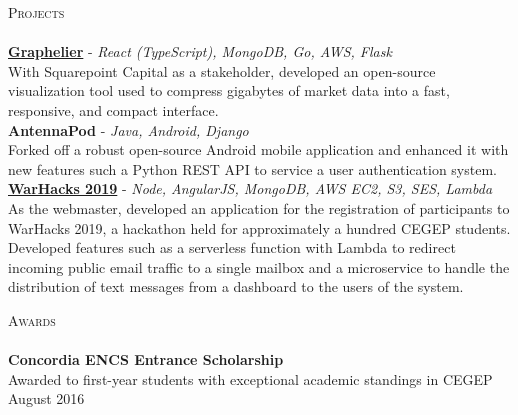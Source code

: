 \documentclass[a4paper]{article}
\newcommand{\lineunder} {
    \vspace*{-8pt} \\
    \hspace*{-18pt} \hrulefill \\
}
\newcommand{\header} [1] {
    {\hspace*{-18pt}\vspace*{6pt} \textsc{#1}}
    \vspace*{-6pt} \lineunder
}
\begin{document}
\header{Projects}
\vspace*{2mm}
{\href{https://github.com/Lercerss/graphelier}{\textbf{Graphelier}}} - {\sl React (TypeScript), MongoDB, Go, AWS, Flask} \\
\vspace*{1mm}
With Squarepoint Capital as a stakeholder, developed an open-source visualization tool used to compress gigabytes of market data into a fast, responsive, and compact interface.\\
\vspace*{4mm}
{\textbf{AntennaPod}} - {\sl Java, Android, Django} \\
\vspace*{1mm}
Forked off a robust open-source Android mobile application and enhanced it with new features such a Python REST API to service a user authentication system.\\
\vspace*{4mm}
{\href{https://github.com/FozAhm/quill}{\textbf{WarHacks 2019}}} - {\sl Node, AngularJS, MongoDB, AWS EC2, S3, SES, Lambda} \\
\vspace*{1mm}
As the webmaster, developed an application for the registration of participants to WarHacks 2019, a hackathon held for approximately a hundred CEGEP students.\\
\vspace*{1mm}
Developed features such as a serverless function with Lambda to redirect incoming public email traffic to a single mailbox and a microservice to handle the distribution of text messages from a dashboard to the users of the system.
\newline

\vspace*{2mm}

\header{Awards}
\textbf{Concordia ENCS Entrance Scholarship}\\
Awarded to first-year students with exceptional academic standings in CEGEP \hfill August 2016\\
\vspace*{2mm}

\ 
\end{document}
